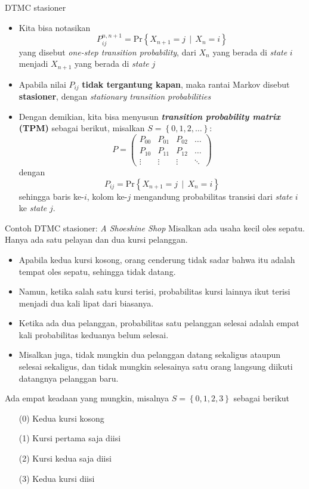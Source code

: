 \documentclass{beamer}
\newcommand{\braces}[1]{\left\{#1\right\}}
\begin{document}
\begin{frame}{DTMC stasioner}
    \begin{itemize}
        \item Kita bisa notasikan
        \[ P_{ij}^{n,n+1} = \text{Pr}\braces{X_{n+1} = j \, \mid \, X_n = i} \]
        yang disebut \textit{one-step transition probability}, dari \(X_n\) yang berada di \textit{state} \(i\) menjadi \(X_{n+1}\) yang berada di \textit{state} \(j\)
        \item Apabila nilai \(P_{ij}\) \textbf{tidak tergantung kapan}, maka rantai Markov disebut \textbf{stasioner}, dengan \textit{stationary transition probabilities}
        \item Dengan demikian, kita bisa menyusun \textbf{\textit{transition probability matrix} (TPM)} sebagai berikut, misalkan \(S=\braces{0,1,2,\dots}\):
        \[ P = \begin{pmatrix}
            P_{00} & P_{01} & P_{02} & \dots \\
            P_{10} & P_{11} & P_{12} & \dots \\
            \vdots & \vdots & \vdots & \ddots
        \end{pmatrix} \]
        dengan
        \[ P_{ij} = \text{Pr}\braces{X_{n+1} = j \, \mid \, X_n = i} \]
        sehingga baris ke-\(i\), kolom ke-\(j\) mengandung probabilitas transisi dari \textit{state} \(i\) ke \textit{state} \(j\).
    \end{itemize}
\end{frame}

\begin{frame}{Contoh DTMC stasioner: \textit{A Shoeshine Shop}}
    Misalkan ada usaha kecil oles sepatu. Hanya ada satu pelayan dan dua kursi pelanggan.
    \begin{itemize}
        \item Apabila kedua kursi kosong, orang cenderung tidak sadar bahwa itu adalah tempat oles sepatu, sehingga tidak datang.
        \item Namun, ketika salah satu kursi terisi, probabilitas kursi lainnya ikut terisi menjadi dua kali lipat dari biasanya.
        \item Ketika ada dua pelanggan, probabilitas satu pelanggan selesai adalah empat kali probabilitas keduanya belum selesai.
        \item Misalkan juga, tidak mungkin dua pelanggan datang sekaligus ataupun selesai sekaligus, dan tidak mungkin selesainya satu orang langsung diikuti datangnya pelanggan baru.
    \end{itemize}

    Ada empat keadaan yang mungkin, misalnya \( S = \braces{0,1,2,3} \) sebagai berikut
    \begin{enumerate}
        \item[(0)] Kedua kursi kosong
        \item[(1)] Kursi pertama saja diisi
        \item[(2)] Kursi kedua saja diisi
        \item[(3)] Kedua kursi diisi
    \end{enumerate}
\end{frame}
\end{document}
